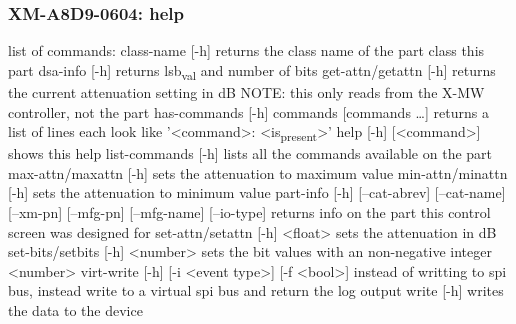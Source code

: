 \documentclass[11pt]{article}
\begin{document}
\subsubsection{XM-A8D9-0604: help}
\label{sec:orgbe0a791}
list of commands:
  class-name [-h]
    returns the class name of the part class this part
  dsa-info [-h]
    returns lsb\textsubscript{val} and number of bits
  get-attn/getattn [-h]
    returns the current attenuation setting in dB
    NOTE: this only reads from the X-MW controller, not the part
  has-commands [-h] commands [commands \ldots{}]
    returns a list of lines each look like '<command>: <is\textsubscript{present}>'
  help [-h] [<command>]
    shows this help
  list-commands [-h]
    lists all the commands available on the part
  max-attn/maxattn [-h]
    sets the attenuation to maximum value
  min-attn/minattn [-h]
    sets the attenuation to minimum value
  part-info  [-h] [--cat-abrev] [--cat-name] [--xm-pn] [--mfg-pn] [--mfg-name]
          [--io-type]
    returns info on the part this control screen was designed for
  set-attn/setattn [-h] <float>
    sets the attenuation in dB
  set-bits/setbits [-h] <number>
    sets the bit values with an non-negative integer <number>
  virt-write [-h] [-i <event type>] [-f <bool>]
    instead of writting to spi bus, instead write to a virtual spi bus
    and return the log output
  write [-h]
    writes the data to the device
\end{document}

